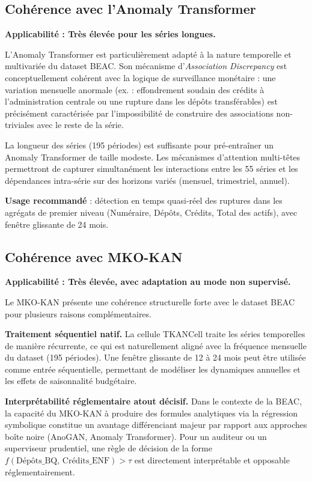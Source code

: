\documentclass[12pt, a4paper]{article}
\begin{document}
\subsection{Cohérence avec l'Anomaly Transformer}

\textbf{Applicabilité : Très élevée pour les séries longues.}

L'Anomaly Transformer est particulièrement adapté à la nature temporelle
et multivariée du dataset BEAC. Son mécanisme d'\textit{Association
Discrepancy} est conceptuellement cohérent avec la logique de surveillance
monétaire : une variation mensuelle anormale (ex. : effondrement soudain
des crédits à l'administration centrale ou une rupture dans les dépôts
transférables) est précisément caractérisée par l'impossibilité de
construire des associations non-triviales avec le reste de la série.

La longueur des séries (195 périodes) est suffisante pour pré-entraîner
un Anomaly Transformer de taille modeste. Les mécanismes d'attention
multi-têtes permettront de capturer simultanément les interactions
entre les 55 séries et les dépendances intra-série sur des horizons
variés (mensuel, trimestriel, annuel).

\textbf{Usage recommandé} : détection en temps quasi-réel des ruptures
dans les agrégats de premier niveau (Numéraire, Dépôts, Crédits,
Total des actifs), avec fenêtre glissante de 24 mois.

\subsection{Cohérence avec MKO-KAN}

\textbf{Applicabilité : Très élevée, avec adaptation au mode non supervisé.}

Le MKO-KAN présente une cohérence structurelle forte avec le dataset BEAC pour
plusieurs raisons complémentaires.

\textbf{Traitement séquentiel natif.}
La cellule TKANCell traite les séries temporelles de manière récurrente, ce
qui est naturellement aligné avec la fréquence mensuelle du dataset (195
périodes). Une fenêtre glissante de 12 à 24 mois peut être utilisée comme
entrée séquentielle, permettant de modéliser les dynamiques annuelles et les
effets de saisonnalité budgétaire.

\textbf{Interprétabilité réglementaire  atout décisif.}
Dans le contexte de la BEAC, la capacité du MKO-KAN à produire des formules
analytiques via la régression symbolique constitue un avantage différenciant
majeur par rapport aux approches boîte noire (AnoGAN, Anomaly Transformer).
Pour un auditeur ou un superviseur prudentiel, une règle de décision de la
forme $f(\text{Dépôts\_BQ} ,\, \text{Crédits\_ENF}) > \tau$ est directement
interprétable et opposable réglementairement.
\end{document}
